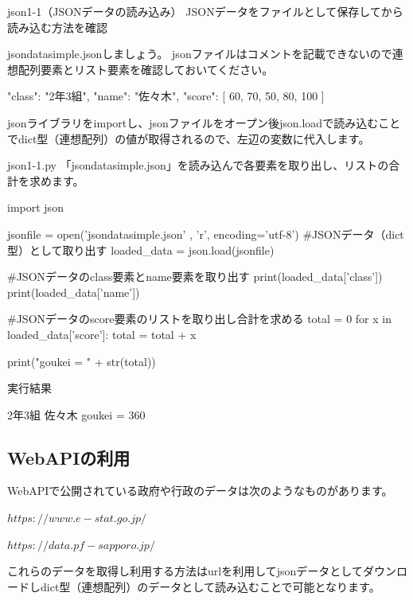 \begin{pabox}{json1-1（JSONデータの読み込み）}
JSONデータをファイルとして保存してから読み込む方法を確認
\begin{legbox}{jsondatasimple.json}しましょう。
jsonファイルはコメントを記載できないので連想配列要素とリスト要素を確認しておいてください。
\begin{listing}{1}
{
    "class": "2年3組",
    "name": "佐々木",
    "score": [
        60,
        70,
        50,
        80,
        100
    ]
}
\end{listing}
\end{legbox}
jsonライブラリをimportし、jsonファイルをオープン後json.loadで読み込むことでdict型（連想配列）の値が取得されるので、左辺の変数に代入します。
\begin{legbox}{json1-1.py}
「jsondatasimple.json」を読み込んで各要素を取り出し、リストの合計を求めます。
\begin{listing}{1}
import json

jsonfile = open('jsondatasimple.json' , 'r', encoding='utf-8') 
#JSONデータ（dict型）として取り出す
loaded_data = json.load(jsonfile)  

#JSONデータのclass要素とname要素を取り出す
print(loaded_data['class'])
print(loaded_data['name'])

#JSONデータのscore要素のリストを取り出し合計を求める
total = 0
for x in loaded_data['score']:
    total = total + x

print("goukei = " + str(total))
\end{listing}
実行結果
\begin{listing}{1}
2年3組
佐々木
goukei = 360
\end{listing}

\end{legbox}
\end{pabox}

\subsection{WebAPIの利用}


WebAPIで公開されている政府や行政のデータは次のようなものがあります。

\begin{description}
	\item $https://www.e-stat.go.jp/$
	\item $https://data.pf-sapporo.jp/$
\end{description}

これらのデータを取得し利用する方法はurlを利用してjsonデータとしてダウンロードしdict型（連想配列）のデータとして読み込むことで可能となります。

